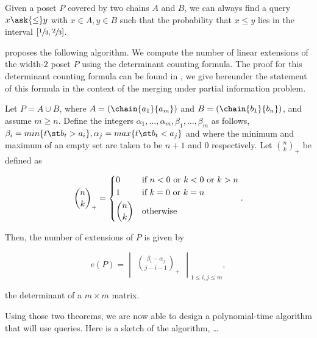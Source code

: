 \begin{theorem}
Given a poset \(P\) covered by two chains \(A\) and \(B\), we can always find
a query \(x \ask{\le} y\) with \(x \in A, y \in B\) such that the probability
that \(x \le y\) lies in the interval \([\sfrac{1}{3}, \sfrac{2}{3}]\).
\end{theorem}

\citet*{linial:1984} proposes the following algorithm. We compute the number of
linear extensions of the width-\(2\) poset \(P\) using the determinant
counting formula. The proof for this determinant counting formula can be found in
\citet*{mohanty:1979}, we give hereunder the statement of this formula in the
context of the merging under partial information problem.

\begin{theorem}
Let \(P = A \cup B\), where \(A = (\chain{a_1}{a_m})\) and \(B =
(\chain{b_1}{b_n})\), and assume \(m \ge n\). Define the integers
\(\alpha_1,\ldots,\alpha_m,\beta_1,\ldots,\beta_m\) as follows, \(\beta_i =
min\{t \st b_t > a_i\}, \alpha_j = max\{t \st b_t < a_j\}\) and where the
minimum and maximum of an empty set are taken to be \(n + 1\) and \(0\)
respectively. Let \(\binom{n}{k}_{+}\) be defined as

\begin{displaymath}
\binom{n}{k}_{+} =
\begin{dcases*}
0            & if  \(n < 0\)  or \(k < 0\)  or \(k > n\)\\
1            & if \(k = 0\)  or \(k = n\)\\
\binom{n}{k} & otherwise\\
\end{dcases*}.
\end{displaymath}

Then, the number of extensions of \(P\) is given by

\begin{displaymath}
e(P) =
\begin{vmatrix}
\binom{\beta_i - \alpha_j}{j - i - 1}_{+}
\end{vmatrix}_{1 \le i , j \le m},
\end{displaymath}

the determinant of a \(m \times m\) matrix.
\end{theorem}

Using those two theorems, we are now able to design a polynomial-time algorithm
that will use  queries. Here is a sketch of the algorithm,
\dots
